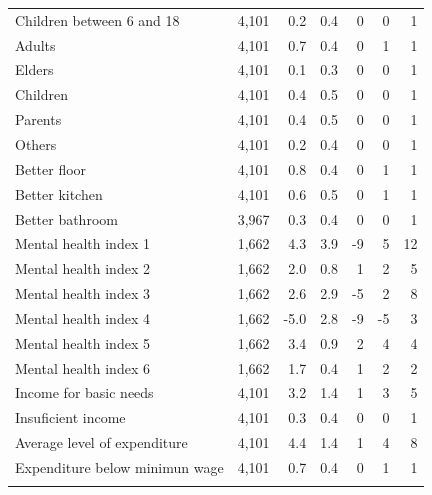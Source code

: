\begin{table}[H]
\begin{tabular}{@{\extracolsep{5pt}}lD{.}{.}{-1} D{.}{.}{-1} D{.}{.}{-1} D{.}{.}{-1} D{.}{.}{-1} D{.}{.}{-1} }
Children between 6 and 18 & 4,101 & 0.2 & 0.4 & 0 & 0 & 1 \\ 
Adults & 4,101 & 0.7 & 0.4 & 0 & 1 & 1 \\ 
Elders & 4,101 & 0.1 & 0.3 & 0 & 0 & 1 \\ 
Children & 4,101 & 0.4 & 0.5 & 0 & 0 & 1 \\ 
Parents & 4,101 & 0.4 & 0.5 & 0 & 0 & 1 \\ 
Others & 4,101 & 0.2 & 0.4 & 0 & 0 & 1 \\ \hline
Better floor & 4,101 & 0.8 & 0.4 & 0 & 1 & 1 \\ 
Better kitchen & 4,101 & 0.6 & 0.5 & 0 & 1 & 1 \\ 
Better bathroom & 3,967 & 0.3 & 0.4 & 0 & 0 & 1 \\ \hline
Mental health index 1 & 1,662 & 4.3 & 3.9 & -9 & 5 & 12 \\ 
Mental health index 2 & 1,662 & 2.0 & 0.8 & 1 & 2 & 5 \\ 
Mental health index 3 & 1,662 & 2.6 & 2.9 & -5 & 2 & 8 \\ 
Mental health index 4 & 1,662 & -5.0 & 2.8 & -9 & -5 & 3 \\ 
Mental health index 5 & 1,662 & 3.4 & 0.9 & 2 & 4 & 4 \\ 
Mental health index 6 & 1,662 & 1.7 & 0.4 & 1 & 2 & 2 \\\hline
Income for basic needs & 4,101 & 3.2 & 1.4 & 1 & 3 & 5 \\ 
Insuficient income & 4,101 & 0.3 & 0.4 & 0 & 0 & 1 \\ 
Average level of expenditure & 4,101 & 4.4 & 1.4 & 1 & 4 & 8 \\ 
Expenditure below minimun wage & 4,101 & 0.7 & 0.4 & 0 & 1 & 1 \\ 
\hline \\[-1.8ex] 
\end{tabular} 
\end{table} 

